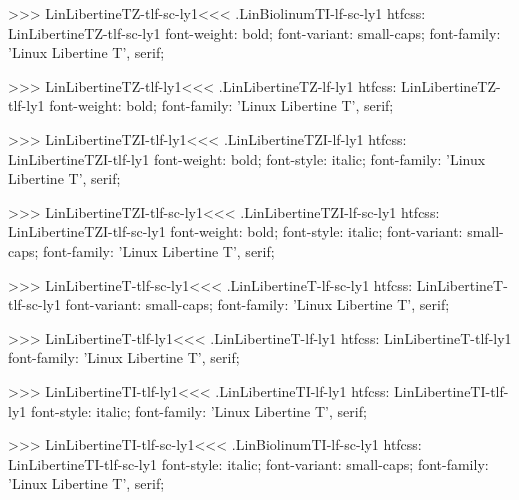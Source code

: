 {{{>>>
\<LinLibertineTZ-tlf-sc-ly1\><<<
.LinBiolinumTI-lf-sc-ly1
htfcss:  LinLibertineTZ-tlf-sc-ly1  font-weight: bold; font-variant: small-caps; font-family: 'Linux Libertine T', serif;

>>>
\<LinLibertineTZ-tlf-ly1\><<<
.LinLibertineTZ-lf-ly1
htfcss:  LinLibertineTZ-tlf-ly1  font-weight: bold; font-family: 'Linux Libertine T', serif;

>>>
\<LinLibertineTZI-tlf-ly1\><<<
.LinLibertineTZI-lf-ly1
htfcss:  LinLibertineTZI-tlf-ly1  font-weight: bold; font-style: italic; font-family: 'Linux Libertine T', serif;

>>>
\<LinLibertineTZI-tlf-sc-ly1\><<<
.LinLibertineTZI-lf-sc-ly1
htfcss:  LinLibertineTZI-tlf-sc-ly1  font-weight: bold; font-style: italic; font-variant: small-caps; font-family: 'Linux Libertine T', serif;

>>>
\<LinLibertineT-tlf-sc-ly1\><<<
.LinLibertineT-lf-sc-ly1
htfcss:  LinLibertineT-tlf-sc-ly1  font-variant: small-caps; font-family: 'Linux Libertine T', serif;

>>>
\<LinLibertineT-tlf-ly1\><<<
.LinLibertineT-lf-ly1
htfcss:  LinLibertineT-tlf-ly1  font-family: 'Linux Libertine T', serif;

>>>
\<LinLibertineTI-tlf-ly1\><<<
.LinLibertineTI-lf-ly1
htfcss:  LinLibertineTI-tlf-ly1  font-style: italic; font-family: 'Linux Libertine T', serif;

>>>
\<LinLibertineTI-tlf-sc-ly1\><<<
.LinBiolinumTI-lf-sc-ly1
htfcss:  LinLibertineTI-tlf-sc-ly1  font-style: italic; font-variant: small-caps; font-family: 'Linux Libertine T', serif;

}}}
